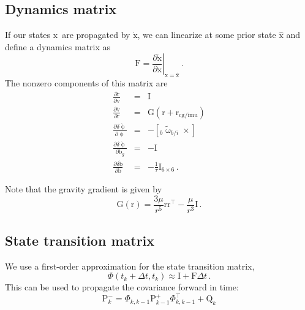 \documentclass[12pt]{article}
\newcommand{\skewsymm}[1]{\ensuremath{\left[ #1 \times \right]}}
\newcommand{\eye}{\ensuremath{\mathrm{I}}}
\newcommand{\vecx}{\ensuremath{\mathrm{x}}}
\newcommand{\dotvecx}{\ensuremath{\dot{\mathrm{x}}}}
\newcommand{\vecb}{\ensuremath{\mathrm{b}}}
\newcommand{\vecr}{\ensuremath{\mathrm{r}}}
\newcommand{\vecv}{\ensuremath{\mathrm{v}}}
\begin{document}
\subsection{Dynamics matrix}
If our states \vecx\ are propagated by \dotvecx, we can linearize at some prior state $\hat{\vecx}$ and define a dynamics matrix as
\begin{equation}
\mathrm{F} = \left.\frac{\partial\dotvecx}{\partial\vecx}\right|_{\vecx = \hat{\vecx}}\,\text{.}
\end{equation}
The nonzero components of this matrix are
\begin{eqnarray}
\frac{\partial\dot{\vecr}}{\partial\vecv} &=& \eye \\
\frac{\partial\dot{\vecv}}{\partial\vecr} &=& \mathrm{G}(\vecr + \vecr_\text{cg/imu}) \\
\frac{\partial\delta\dot{\upphi}}{\partial\upphi} &=& -\skewsymm{{}_b \tilde{\upomega}_{b/i}} \\
\frac{\partial\delta\dot{\upphi}}{\partial\vecb_g} &=& -\eye \\
\frac{\partial\delta\dot{\vecb}}{\partial\vecb} &=& -\frac{1}{\tau} \eye_{6\times 6}\,\text{.}
\end{eqnarray}

Note that the gravity gradient is given by
\begin{equation}
\mathrm{G}(\vecr) = \frac{3\mu}{r^5} \vecr\vecr^\top - \frac{\mu}{r^3}\eye\,\text{.}
\end{equation}


\subsection{State transition matrix}
We use a first-order approximation for the state transition matrix,
\begin{equation}
\Phi(t_k + \Delta t, t_k) \approx \eye + \mathrm{F} \Delta t\,\text{.}
\end{equation}
This can be used to propagate the covariance forward in time:
\begin{equation}
\mathrm{P}_k^{-} = \Phi_{k,k-1} \mathrm{P}_{k-1}^{+} \Phi_{k,k-1}^\top + \mathrm{Q}_k
\end{equation}
\end{document}
